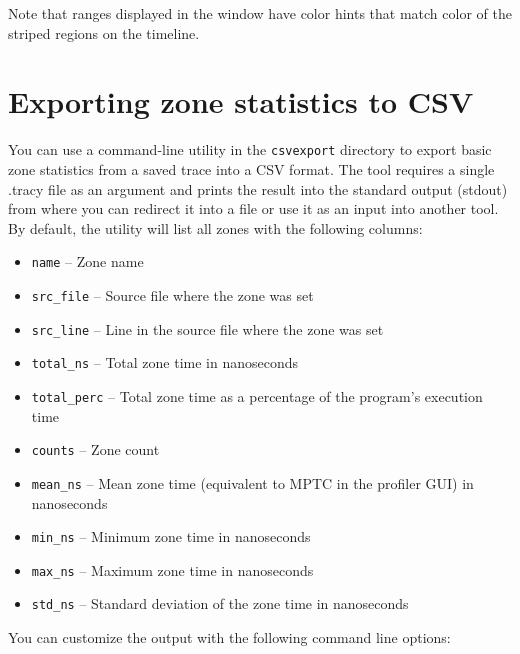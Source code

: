 \documentclass[hidelinks,titlepage,a4paper]{article}
\begin{document}
Note that ranges displayed in the window have color hints that match color of the striped regions on the timeline.

\section{Exporting zone statistics to CSV}
\label{csvexport}

You can use a command-line utility in the \texttt{csvexport} directory to export basic zone statistics from a saved trace into a CSV format.
The tool requires a single .tracy file as an argument and prints the result into the standard output (stdout) from where you can redirect it into a file or use it as an input into another tool.
By default, the utility will list all zones with the following columns:

\begin{itemize}
  \item \texttt{name} -- Zone name
  \item \texttt{src\_file} -- Source file where the zone was set
  \item \texttt{src\_line} -- Line in the source file where the zone was set
  \item \texttt{total\_ns} -- Total zone time in nanoseconds
  \item \texttt{total\_perc} -- Total zone time as a percentage of the program's execution time
  \item \texttt{counts} -- Zone count
  \item \texttt{mean\_ns} -- Mean zone time (equivalent to MPTC in the profiler GUI) in nanoseconds
  \item \texttt{min\_ns} -- Minimum zone time in nanoseconds
  \item \texttt{max\_ns} -- Maximum zone time in nanoseconds
  \item \texttt{std\_ns} -- Standard deviation of the zone time in nanoseconds
\end{itemize}

You can customize the output with the following command line options:
\end{document}
